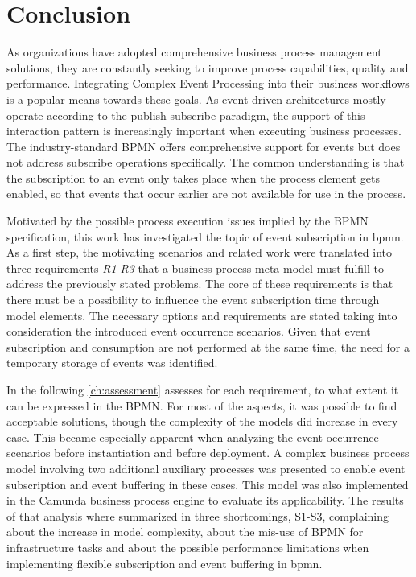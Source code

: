 \chapter{Conclusion}\label{ch:conclusion}

As organizations have adopted comprehensive business process management solutions, they are constantly seeking to improve process capabilities, quality and performance.
Integrating Complex Event Processing into their business workflows is a popular means towards these goals.
As event-driven architectures mostly operate according to the publish-subscribe paradigm, the support of this interaction pattern is increasingly important when executing business processes.
The industry-standard \acf{BPMN} offers comprehensive support for events but does not address subscribe operations specifically.
The common understanding is that the subscription to an event only takes place when the process element gets enabled, so that events that occur earlier are not available for use in the process.

Motivated by the possible process execution issues implied by the BPMN specification, this work has investigated the topic of event subscription in bpmn.
As a first step, the motivating scenarios and related work were translated into three requirements \textit{R1-R3} that a business process meta model must fulfill to address the previously stated problems.
The core of these requirements is that there must be a possibility to influence the event subscription time through model elements. The necessary options and requirements are stated taking into consideration the introduced event occurrence scenarios.
Given that event subscription and consumption are not performed at the same time, the need for a temporary storage of events was identified.

In the following \autoref{ch:assessment} assesses for each requirement, to what extent it can be expressed in the BPMN.
For most of the aspects, it was possible to find acceptable solutions, though the complexity of the models did increase in every case.
This became especially apparent when analyzing the event occurrence scenarios before instantiation and before deployment. A complex business process model involving two additional auxiliary processes was presented to enable event subscription and event buffering in these cases. This model was also implemented in the Camunda business process engine to evaluate its applicability.
The results of that analysis where summarized in three shortcomings, S1-S3, complaining about the increase in model complexity, about the mis-use of BPMN for infrastructure tasks and about the possible performance limitations when implementing flexible subscription and event buffering in bpmn.

